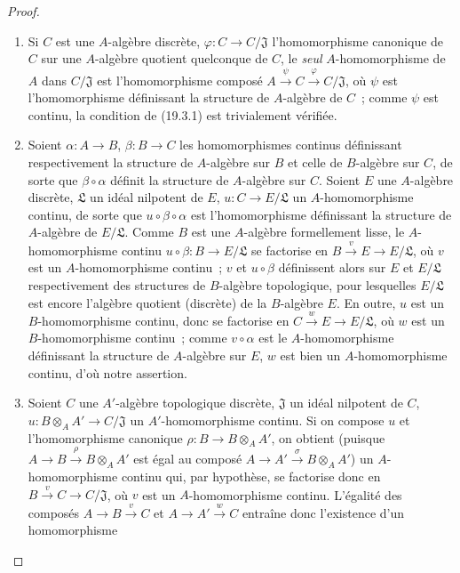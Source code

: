 \begin{proof}
\begin{enumerate}
  \item[(i)] Si $C$ est une $A$-algèbre discrète,
  $\varphi:C\to C/\mathfrak J$ l'homomorphisme canonique de $C$ sur une
  $A$-algèbre quotient quelconque de $C$, le \emph{seul} $A$-homomorphisme
  de $A$ dans $C/\mathfrak J$ est l'homomorphisme composé
  $A\xrightarrow{\psi}C\xrightarrow{\varphi}C/\mathfrak J$, où
  $\psi$ est l'homomorphisme définissant la structure de $A$-algèbre de
  $C$~; comme $\psi$ est continu, la condition de (19.3.1) est trivialement
  vérifiée.
  \item[(ii)] Soient $\alpha:A\to B$, $\beta:B\to C$ les homomorphismes
  continus définissant respectivement la structure de $A$-algèbre sur $B$ et
  celle de $B$-algèbre sur $C$, de sorte que $\beta\circ\alpha$ définit la
  structure de $A$-algèbre sur $C$. Soient $E$ une $A$-algèbre discrète,
  $\mathfrak L$ un idéal nilpotent de $E$, $u:C\to E/\mathfrak L$ un
  $A$-homomorphisme continu, de sorte que $u\circ\beta\circ\alpha$ est
  l'homomorphisme définissant la structure de $A$-algèbre de
  $E/\mathfrak L$. Comme $B$ est une $A$-algèbre formellement lisse, le
  $A$-homomorphisme continu $u\circ\beta:B\to E/\mathfrak L$ se
  factorise en $B\xrightarrow{v}E\to E/\mathfrak L$, où $v$ est un
  $A$-homomorphisme continu~; $v$ et $u\circ\beta$ définissent alors sur
  $E$ et $E/\mathfrak L$ respectivement des structures de $B$-algèbre
  topologique, pour lesquelles $E/\mathfrak L$ est encore l'algèbre quotient
  (discrète) de la $B$-algèbre $E$. En outre, $u$ est un $B$-homomorphisme
  continu, donc se factorise en $C\xrightarrow{w}E\to E/\mathfrak L$,
  où $w$ est un $B$-homomorphisme continu~; comme
  $v\circ\alpha$ est le $A$-homomorphisme définissant la structure de
  $A$-algèbre sur $E$, $w$ est bien un $A$-homomorphisme continu, d'où notre
  assertion.
  \item[(iii)] Soient $C$ une $A'$-algèbre topologique discrète,
  $\mathfrak J$ un idéal nilpotent de $C$,
  $u:B\otimes_A A'\to C/\mathfrak J$ un $A'$-homomorphisme continu. Si on
  compose $u$ et l'homomorphisme canonique
  $\rho:B\to B\otimes_A A'$, on obtient (puisque
  $A\to B\xrightarrow{\rho}B\otimes_A A'$ est égal au composé
  $A\to A'\xrightarrow{\sigma}B\otimes_A A'$) un $A$-homomorphisme
  continu qui, par hypothèse, se factorise donc en
  $B\xrightarrow{v}C\to C/\mathfrak J$, où $v$ est un $A$-homomorphisme
  continu. L'égalité des composés $A\to B\xrightarrow{v}C$ et
  $A\to A'\xrightarrow{w}C$ entraîne donc l'existence d'un homomorphisme

\end{enumerate}
\end{proof}
